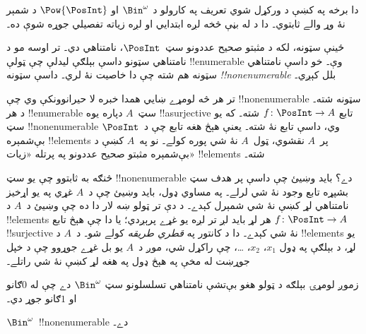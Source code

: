 \documentclass[../../../include/open-logic-section]{subfiles}
\begin{document}


\begin{editorial}
  دا برخه په  کښې د ورکړل شوي تعريف په کارولو د
  $\Bin^\omega$ او $\Pow{\PosInt}$ د شمېر نۀ وړ والے ثابتوي۔ دا
  د  له بڼې څخه لږه ابتدايي او لږه زياته
  تفصيلي جوړه شوې ده۔
\end{editorial}

ځينې سټونه، لکه د مثبتو صحيح عددونو سټ~$\PosInt$، نامتناهي دي۔
تر اوسه مو د نامتناهي سټونو داسې بېلګې ليدلې چې ټولې
!!{enumerable} وې۔ خو داسې نامتناهي سټونه هم شته چې دا خاصيت نۀ
لري۔ داسې سټونه \emph{!!{nonenumerable}} بلل کېږي۔

تر هر څه لومړے ښايي همدا خبره لا حيرانوونکې وي چې !!{nonenumerable}
سټونه شته۔ د هر !!{enumerable} سټ~$A$ دپاره يوه !!a{surjective}
تابع $f \colon \PosInt \to A$ شته۔ که يو سټ !!{nonenumerable} وي،
داسې تابع نۀ شته۔ يعنې هېڅ هغه تابع چې د~$\PosInt$ بې‌شمېره
!!{element}s پر~$A$ نقشوي، ټول~$A$ نۀ شي پوره کولے۔ نو په~$A$
کښې د بې‌شمېره مثبتو صحيح عددونو په پرتله «زيات» !!{element}s شته۔

څنګه به ثابتوو چې يو سټ !!{nonenumerable} دے؟ بايد وښيئ چې داسې
پر هدف سټ بشپړه تابع وجود نۀ شي لرلے۔ په مساوي ډول، بايد وښيئ
چې د~$A$ غړي په يو اړخيز نامتناهي لړ کښې نۀ شي شمېرل کېدے۔ د
دې تر ټولو ښه لار دا ده چې وښيئ د~$A$ د !!{element}s هر لړ بايد
لږ تر لږه يو غړے پرېږدي؛ يا دا چې هېڅ تابع
$f\colon \PosInt \to A$ !!{surjective} نۀ شي کېدے۔ دا د کانتور
په \emph{قطري طريقه} کولے شو۔ د~$A$ د !!{element}s يو لړ، د بېلګې
په ډول $x_1$، $x_2$، \dots، چې راکړل شي، موږ د~$A$ يو بل غړے
جوړوو چې د خپل جوړښت له مخې په هېڅ ډول په هغه لړ کښې نۀ شي راتلے۔

زموږ لومړۍ بېلګه د ټولو هغو بې‌تشې نامتناهي تسلسلونو سټ
$\Bin^\omega$ دے چې له $0$ګانو او $1$ګانو جوړ دي۔

\begin{thm}
$\Bin^\omega$~!!{nonenumerable} دے۔
\end{thm}
\end{document}
